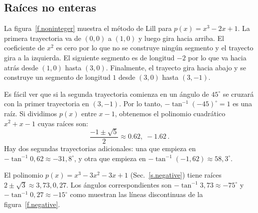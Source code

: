 \subsection{Raíces no enteras}\label{s.noninteger}
La figura~\ref{f.noninteger} muestra el método de Lill para $p(x)=x^3-2x+1$. La primera trayectoria va de $(0,0)$ a $(1,0)$ y luego gira hacia arriba. El coeficiente de $x^2$ es cero por lo que no se construye ningún segmento y el trayecto gira a la izquierda. El siguiente segmento es de longitud $-2$ por lo que va hacia atrás desde $(1,0)$ hasta $(3,0)$. Finalmente, el trayecto gira hacia abajo y se construye un segmento de longitud $1$ desde $(3,0)$ hasta $(3,-1)$.

Es fácil ver que si la segunda trayectoria comienza en un ángulo de $ 45^\circ $ se cruzará con la primer trayectoria en $ (3,-1) $. Por lo tanto, $-\tan^{-1} (-45)^\circ=1$ es una raíz. Si dividimos $p(x)$ entre $x-1$, obtenemos el polinomio cuadrático $x^2+x-1$ cuyas raíces son:
\[
\frac{-1\pm\sqrt{5}}{2} \approx 0.62,\; -1.62\,.
\]
Hay dos segundas trayectorias adicionales: una que empieza en $-\tan^{-1} 0,62\approx -31,8^\circ$, y otra que empieza en $-\tan^{-1}(-1,62)\approx 58,3^\circ$.

El polinomio $p(x)=x^3-3x^2-3x+1$ (Sec.~\ref{s.negative}) tiene raíces $ 2\pm\sqrt{3}\approx 3,73, 0,27$. Los ángulos correspondientes son $-\tan^{-1} 3,73 \approx -75^\circ$ y $-\tan^{-1} 0,27 \approx -15^\circ$ como muestran las líneas discontinuas de la figura~\ref{f.negative}.


